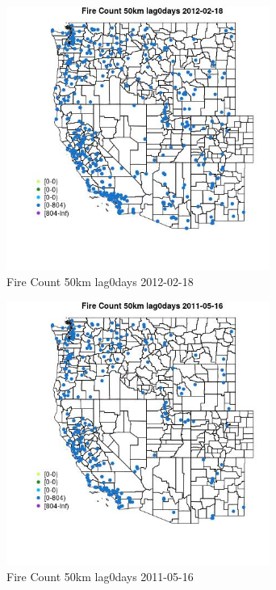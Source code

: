 \begin{figure} 
\centering  
\includegraphics[width=0.77\textwidth]{Code_Outputs/Report_ML_input_PM25_Step4_part_f_de_duplicated_aveswNAs_MapObsFire_Count_50km_lag0days2012-02-18.jpg} 
\caption{\label{fig:Report_ML_input_PM25_Step4_part_f_de_duplicated_aveswNAsMapObsFire_Count_50km_lag0days2012-02-18}Fire Count 50km lag0days 2012-02-18} 
\end{figure} 
 

\begin{figure} 
\centering  
\includegraphics[width=0.77\textwidth]{Code_Outputs/Report_ML_input_PM25_Step4_part_f_de_duplicated_aveswNAs_MapObsFire_Count_50km_lag0days2011-05-16.jpg} 
\caption{\label{fig:Report_ML_input_PM25_Step4_part_f_de_duplicated_aveswNAsMapObsFire_Count_50km_lag0days2011-05-16}Fire Count 50km lag0days 2011-05-16} 
\end{figure} 
 

